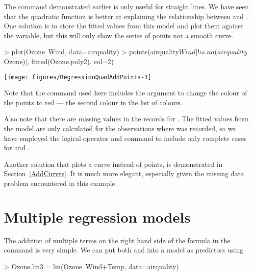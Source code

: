 The  command demonstrated earlier is only useful for straight lines. We have seen that the quadratic function is better at explaining the relationship between  and . One solution is to store the fitted values from this model and plot them against the  variable, but this will only show the series of points not a smooth curve.  

\begin{Schunk}
\begin{Sinput}
> plot(Ozone~Wind, data=airquality) 
> points(airquality$Wind[!is.na(airquality$Ozone)], fitted(Ozone.poly2), col=2) 
\end{Sinput}

\texttt{[image: figures/RegressionQuadAddPoints-1]} \end{Schunk}

 
Note that the  command used here includes the  argument to change the colour of the points to red --- the second colour in the list of colours.  
 
Also note that there are missing values in the records for . The fitted values from the model are only calculated for the observations where  was recorded, so we have employed the \Rcmd{!} logical operator and  command to include only complete cases for  and . 
 
Another solution that plots a curve instead of points, is demonstrated in Section~\ref{AddCurves}. It is much more elegant, especially given the missing data problem encountered in this example. 
 
 
 
\section{Multiple regression models} 
 
The addition of multiple terms on the right hand side of the formula in the  command is very simple. We can put both  and  into a model as predictors using 

\begin{Schunk}
\begin{Sinput}
> Ozone.lm3 = lm(Ozone~Wind+Temp, data=airquality) 
\end{Sinput}
\end{Schunk}

